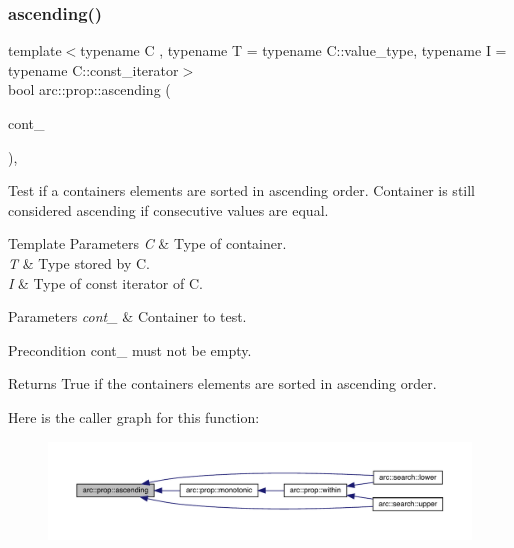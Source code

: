 \subsubsection{\texorpdfstring{ascending()}{ascending()}}
{\footnotesize\ttfamily template$<$typename C , typename T  = typename C\+::value\+\_\+type, typename I  = typename C\+::const\+\_\+iterator$>$ \\
bool arc\+::prop\+::ascending (\begin{DoxyParamCaption}\item[{const C \&}]{cont\+\_\+ }\end{DoxyParamCaption})\hspace{0.3cm}{\ttfamily [inline]}, {\ttfamily [noexcept]}}

Test if a container\textquotesingle{}s elements are sorted in ascending order. Container is still considered ascending if consecutive values are equal.


\begin{DoxyTemplParams}{Template Parameters}
{\em C} & Type of container. \\
\hline
{\em T} & Type stored by C. \\
\hline
{\em I} & Type of const iterator of C.\\
\hline
\end{DoxyTemplParams}

\begin{DoxyParams}{Parameters}
{\em cont\+\_\+} & Container to test.\\
\hline
\end{DoxyParams}
\begin{DoxyPrecond}{Precondition}
cont\+\_\+ must not be empty.
\end{DoxyPrecond}
\begin{DoxyReturn}{Returns}
True if the container\textquotesingle{}s elements are sorted in ascending order. 
\end{DoxyReturn}
Here is the caller graph for this function\+:\nopagebreak
\begin{figure}[H]
\begin{center}
\leavevmode
\includegraphics[width=350pt]{namespacearc_1_1prop_a026d439c76bdafd78b68875044d7b087_icgraph}
\end{center}
\end{figure}
\mbox{\label{namespacearc_1_1prop_a54974d0d56ee90909eac6cdd1b94cff5}} 
